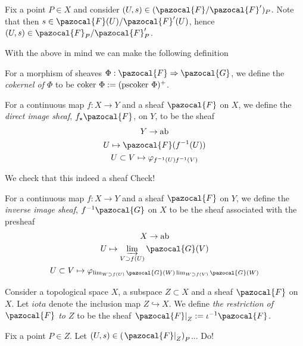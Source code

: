 \begin{remark}
    Fix a point $P\in X$ and consider $(U,s)\in (\pazocal{F}/\pazocal{F}')_P$. Note that then $s\in \pazocal{F}(U)/\pazocal{F}'(U)$, hence $(U,s)\in \pazocal{F}_P/\pazocal{F}'_P$.
\end{remark}
With the above in mind we can make the following definition
\begin{definition}
    For a morphism of sheaves $\Phi : \pazocal{F}\Rightarrow \pazocal{G}$, we define the \emph{cokernel of $\Phi$} to be $\coker\ \Phi := (\mathrm{pscoker}\ \Phi)^{+}$.
\end{definition}
\begin{definition}
    For a continuous map $f : X\rightarrow Y$ and a sheaf $\pazocal{F}$ on $X$, we define the \emph{direct image sheaf}, $f_\star\pazocal{F}$, on $Y$, to be the sheaf
    \begin{gather*}
        Y \rightarrow \mathrm{ab}\\
        U \mapsto \pazocal{F}(f^{-1}(U))\\
        U\subset V \mapsto \varphi_{f^{-1}(U)f^{-1}(V)}
    \end{gather*}
\end{definition}
\begin{remark}
    We check that this indeed a sheaf {\Large Check!}
\end{remark}
\begin{definition}
    For a continuous map $f : X\rightarrow Y$ and a sheaf $\pazocal{F}$ on $Y$, we define the \emph{inverse image sheaf}, $f^{-1}\pazocal{G}$ on $X$ to be the sheaf associated with the presheaf
    \begin{gather*}
        X\rightarrow \mathrm{ab}\\
        U\mapsto \varinjlim_{V\supset f(U)}\pazocal{G}(V)\\
        U\subset V\mapsto \varphi_{\lim_{W\supset f(U)}\pazocal{G}(W)\lim_{W\supset f(V)}\pazocal{G}(W)}
    \end{gather*}
\end{definition}
\begin{definition}
    Consider a topological space $X$, a subspace $Z\subset X$ and a sheaf $\pazocal{F}$ on $X$. Let $iota$ denote the inclusion map $Z\hookrightarrow X$. We define \emph{the restriction of $\pazocal{F}$ to $Z$} to be the sheaf $\left.\pazocal{F}\right|_{Z}:= \iota^{-1}\pazocal{F}$.
\end{definition}
\begin{remark}
    Fix a point $P\in Z$. Let $(U,s)\in \left(\left. \pazocal{F}\right|_Z\right)_P$... {\Large Do!}
\end{remark}
